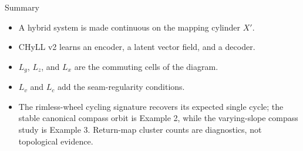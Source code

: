 \documentclass[10pt,aspectratio=169]{beamer}
\begin{document}
\begin{frame}{Summary}
  \begin{itemize}
    \item A hybrid system is made continuous on the mapping cylinder \(X'\).
    \item CHyLL v2 learns an encoder, a latent vector field, and a decoder.
    \item \(L_g\), \(L_z\), and \(L_x\) are the commuting cells of the diagram.
    \item \(L_v\) and \(L_c\) add the seam-regularity conditions.
    \item The rimless-wheel cycling signature recovers its expected single
      cycle; the stable canonical compass orbit is Example 2, while the
      varying-slope compass study is Example 3.  Return-map cluster counts are
      diagnostics, not topological evidence.
  \end{itemize}
\end{frame}
\end{document}
